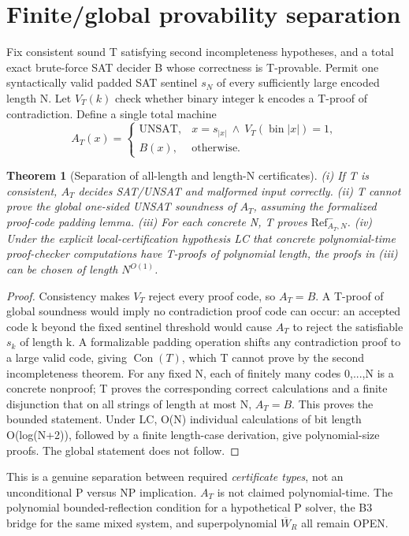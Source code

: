 \documentclass[11pt]{article}
\newtheorem{theorem}{Theorem}
\begin{document}
\section{Finite/global provability separation}
Fix consistent sound T satisfying second incompleteness hypotheses, and a total exact brute-force SAT decider B whose correctness is T-provable. Permit one syntactically valid padded SAT sentinel $s_N$ of every sufficiently large encoded length N. Let $V_T(k)$ check whether binary integer k encodes a T-proof of contradiction. Define a single total machine
\[
A_T(x)=
\begin{cases}
\mathrm{UNSAT},&x=s_{|x|}\ \wedge\ V_T(\operatorname{bin}|x|)=1,\\
B(x),&\mathrm{otherwise}.
\end{cases}
\]
\begin{theorem}[Separation of all-length and length-N certificates]
(i) If T is consistent, $A_T$ decides SAT/UNSAT and malformed input correctly.
(ii) T cannot prove the global one-sided UNSAT soundness of $A_T$, assuming the formalized proof-code padding lemma.
(iii) For each concrete N, T proves $\mathrm{Ref}^{-}_{A_T,N}$.
(iv) Under the explicit local-certification hypothesis LC that concrete polynomial-time proof-checker computations have T-proofs of polynomial length, the proofs in (iii) can be chosen of length $N^{O(1)}$.
\end{theorem}
\begin{proof}
Consistency makes $V_T$ reject every proof code, so $A_T=B$. A T-proof of global soundness would imply no contradiction proof code can occur: an accepted code k beyond the fixed sentinel threshold would cause $A_T$ to reject the satisfiable $s_k$ of length k. A formalizable padding operation shifts any contradiction proof to a large valid code, giving $\operatorname{Con}(T)$, which T cannot prove by the second incompleteness theorem. For any fixed N, each of finitely many codes 0,...,N is a concrete nonproof; T proves the corresponding correct calculations and a finite disjunction that on all strings of length at most N, $A_T=B$. This proves the bounded statement. Under LC, O(N) individual calculations of bit length O(log(N+2)), followed by a finite length-case derivation, give polynomial-size proofs. The global statement does not follow.
\end{proof}
\noindent This is a genuine separation between required \emph{certificate types}, not an unconditional P versus NP implication. $A_T$ is not claimed polynomial-time. The polynomial bounded-reflection condition for a hypothetical P solver, the B3 bridge for the same mixed system, and superpolynomial $\overline W_R$ all remain OPEN.
\end{document}
